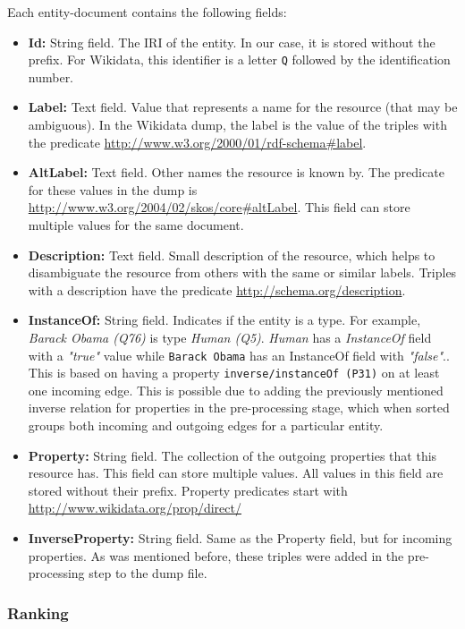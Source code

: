 Each entity-document contains the following fields:
\begin{itemize}
    \item \textbf{Id:} String field. The IRI of the entity. In our case, it is stored without the prefix. For Wikidata, this identifier is a letter \texttt{Q} followed by the identification number.
    \item \textbf{Label:} Text field.  Value that represents a name for the resource (that may be ambiguous).  In the Wikidata dump, the label is the value of the triples with the predicate \url{http://www.w3.org/2000/01/rdf-schema#label}. 
    \item \textbf{AltLabel:} Text field. Other names the resource is known by.  The predicate for these values in the dump is \url{http://www.w3.org/2004/02/skos/core#altLabel}. This field can store multiple values for the same document.
    \item \textbf{Description:} Text field. Small description of the resource, which helps to disambiguate the resource from others with the same or similar labels. Triples with a description have the predicate \url{http://schema.org/description}.
    \item \textbf{InstanceOf:} String field. Indicates if the entity is a type. For example, \textit{Barack Obama (Q76)} is type \textit{Human (Q5)}. \textit{Human} has a \textit{InstanceOf} field with a \textit{"true"} value while \texttt{Barack Obama} has an InstanceOf field with \textit{"false"}.. This is based on having a property \texttt{inverse/instanceOf (P31)} on at least one incoming edge. This is possible due to adding the previously mentioned inverse relation for properties in the pre-processing stage, which when sorted groups both incoming and outgoing edges for a particular entity.
    \item \textbf{Property:} String field. The collection of the outgoing properties that this resource has. This field can store multiple values. All values in this field are stored without their prefix. Property predicates start with  \url{http://www.wikidata.org/prop/direct/}
    \item \textbf{InverseProperty:} String field. Same as the Property field, but for incoming properties. As was mentioned before, these triples were added in the pre-processing step to the dump file.
\end{itemize}

\subsubsection{Ranking}

